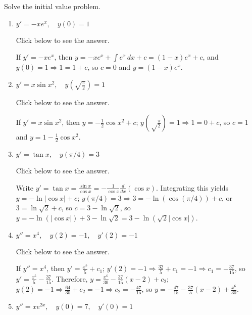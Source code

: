 \documentclass{ximera}
\begin{document}
\begin{problem}\label{exer:1.2.4}
Solve the  initial value problem.

\begin{enumerate}
\item %
 $y'=-xe^x, \quad y(0)=1$

Click below to see the answer.

\begin{expandable}
    If $y'=-xe^x$, then
$y=-xe^x+\int e^x\,dx+c=(1-x)e^x+c$,
and $y(0)=1\Rightarrow 1=1+c$, so $c=0$ and $y=(1-x)e^x$.
\end{expandable}
 
\item %
 $y'=x \sin x^2, \quad y\left(\sqrt{\frac{\pi}{2}}\right)=1$

 Click below to see the answer.

 \begin{expandable}
     If
$y'=x\sin x^2$, then
$y=-\frac{1}{2}\cos x^2+c$;
$y\left({\sqrt\frac{\pi}{2}}\right)=1 \Rightarrow 1=0+c$,
so $c=1$ and $y=1-\frac{1}{2}\cos x^2$.
 \end{expandable}

\item %
$y'=\tan x, \quad y(\pi/4)=3$

Click below to see the answer.

\begin{expandable}
    Write $y'=\tan x=\frac{\sin x}{\cos x}=-\frac{1}{\cos
x}\frac{d}{dx}(\cos x)$. Integrating this yields $y=-\ln|\cos x|+c$;
 $y(\pi/4)=3\Rightarrow 3=-\ln\left(\cos(\pi/4)\right)+c$, or
$3=\ln\sqrt2+c$, so $c=3-\ln\sqrt2$, so
$y=-\ln(|\cos x|)+3-\ln\sqrt2=3-\ln(\sqrt2|\cos x|)$.
\end{expandable}

\item %
$y''=x^4, \quad y(2)=-1, \quad y'(2)=-1$

Click below to see the answer.

\begin{expandable}
    If $y''=x^4$, then $y'=\frac{x^5}{5}+c_1$; $y'(2)=-1
\Rightarrow\frac{32}{5}+c_1=-1\Rightarrow c_1=-\frac{37}{15}$,
so $y'=\frac{x^5}{5}-\frac{37}{15}$. Therefore, $y=\frac{x^6}{30}
-\frac{37}{15}(x-2)+c_2$; $y(2)=-1\Rightarrow\frac{64}{30}+c_2=-1
\Rightarrow c_2=-\frac{47}{15}$, so
$y=-\frac{47}{15}-\frac{37}{5}(x-2)+\frac{x^6}{30}$.
\end{expandable}

\item %
$y''=xe^{2x}, \quad y(0)=7, \quad y'(0)=1$


\end{enumerate}
\end{problem}
\end{document}
